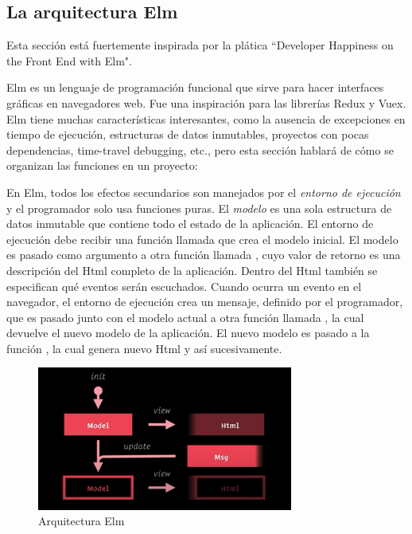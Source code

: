 \documentclass{article}
\newcommand{\code}[1]{\tcbox{\texttt{#1}}}
\begin{document}
\subsection{La arquitectura Elm}
Esta sección está fuertemente inspirada por la plática ``Developer Happiness on the Front End with Elm"\cite{developer-happiness-elm}.

Elm es un lenguaje de programación funcional que sirve para hacer interfaces gráficas en navegadores web. Fue una inspiración para las librerías Redux\cite{redux-elm} y Vuex\cite{vuex-elm}. Elm tiene muchas características interesantes, como la ausencia de excepciones en tiempo de ejecución, estructuras de datos inmutables, proyectos con pocas dependencias, time-travel debugging, etc., pero esta sección hablará de cómo se organizan las funciones en un proyecto:

En Elm, todos los efectos secundarios son manejados por el \textit{entorno de ejecución} y el programador solo usa funciones puras. El \textit{modelo} es una sola estructura de datos inmutable que contiene todo el estado de la aplicación. El entorno de ejecución debe recibir una función llamada \code{init} que crea el modelo inicial. El modelo es pasado como argumento a otra función llamada \code{view}, cuyo valor de retorno es una descripción del Html completo de la aplicación. Dentro del Html también se especifican qué eventos serán escuchados. Cuando ocurra un evento en el navegador, el entorno de ejecución crea un mensaje, definido por el programador, que es pasado junto con el modelo actual a otra función llamada \code{update}, la cual devuelve el nuevo modelo de la aplicación. El nuevo modelo es pasado a la función \code{view}, la cual genera nuevo Html y así sucesivamente.
\begin{figure}[h]
\centering
\includegraphics[width=0.75\textwidth]{elm-architecture}
\caption{Arquitectura Elm}
\end{figure}
\end{document}
